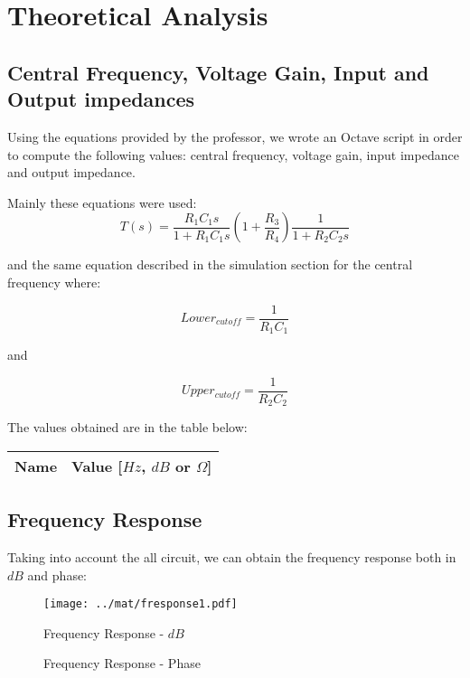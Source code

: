 \section{Theoretical Analysis}
\label{sec:analysis}

\subsection{Central Frequency, Voltage Gain, Input and Output impedances}
Using the equations provided by the professor, we wrote an Octave script in order to compute the following values: central frequency, voltage gain, input impedance and output impedance. \par
Mainly these equations were used:
\begin{equation}
    T(s) = \frac{R_1 C_1 s}{1+ R_1 C_1 s} (1+\frac{R_3}{R_4}) \frac{1}{1+ R_2 C_2 s}
\end{equation}\par
and the same equation described in the simulation section for the central frequency where: \par
\begin{equation}
    Lower_{cutoff} = \frac{1}{R_1 C_1}
\end{equation}\par
and \par
\begin{equation}
    Upper_{cutoff} = \frac{1}{R_2 C_2}
\end{equation}\par
The values obtained are in the table below:

\begin{center}
  \begin{tabular}{ | c | c | }
    \hline    
    {\bf Name} & {\bf Value [$Hz$, $dB$ or $\Omega$]} \\ \hline
    
    \hline
  \end{tabular}
\end{center}

\subsection{Frequency Response}
Taking into account the all circuit, we can obtain the frequency response both in $dB$ and phase:\par

\begin{figure}[H] \centering
\texttt{[image: ../mat/fresponse1.pdf]}
\caption{Frequency Response - $dB$}
\label{fig:fresponse1}
\end{figure}

\begin{figure}[H] \centering
\caption{Frequency Response - Phase}
\label{fig:fresponse2}
\end{figure}
